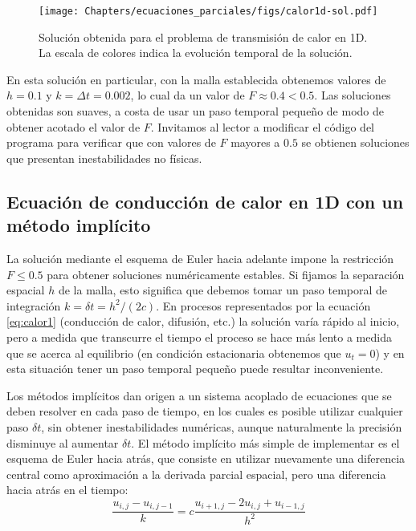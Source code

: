 \begin{figure}[ht]
 \centering
 \texttt{[image: Chapters/ecuaciones\_parciales/figs/calor1d-sol.pdf]}
 \caption{Solución obtenida para el problema de transmisión de calor en 1D. La escala de colores indica la evolución temporal de la solución.}
 \label{fig:calor1Dsol}
\end{figure}

En esta solución en particular, con la malla establecida obtenemos valores de $h = 0.1$ y $k = \Delta t = 0.002$, lo cual da un valor de $F \approx 0.4 < 0.5$. Las soluciones obtenidas son suaves, a costa de usar un paso temporal pequeño de modo de obtener acotado el valor de $F$. Invitamos al lector a modificar el código del programa para verificar que con valores de $F$ mayores a $0.5$ se obtienen soluciones que presentan inestabilidades no físicas.

\subsection{Ecuación de conducción de calor en 1D con un método implícito} \label{subsec:calor_implicito}
La solución mediante el esquema de Euler hacia adelante impone la restricción $F \leq 0.5$ para obtener soluciones numéricamente estables. Si fijamos la separación espacial $h$ de la malla, esto significa que debemos tomar un paso temporal de integración $k = \delta t = h^2/(2c)$. En procesos representados por la ecuación \eqref{eq:calor1} (conducción de calor, difusión, etc.) la solución varía rápido al inicio, pero a medida que transcurre el tiempo el proceso se hace más lento a medida que se acerca al equilibrio (en condición estacionaria obtenemos que $u_t = 0$) y en esta situación tener un paso temporal pequeño puede resultar inconveniente. 

Los métodos implícitos dan origen a un sistema acoplado de ecuaciones que se deben resolver en cada paso de tiempo, en los cuales es posible utilizar cualquier paso $\delta t$, sin obtener inestabilidades numéricas, aunque naturalmente la precisión disminuye al aumentar $\delta t$. El método implícito más simple de implementar es el esquema de Euler hacia atrás, que consiste en utilizar nuevamente una diferencia central como aproximación a la derivada parcial espacial, pero una diferencia hacia atrás en el tiempo:
\begin{equation}\label{eq:discreta2}
  \frac{u_{i,j} - u_{i,j-1}}{k} = c \frac{u_{i+1,j} - 2 u_{i,j} + u_{i-1, j}}{h ^2}
\end{equation} 

